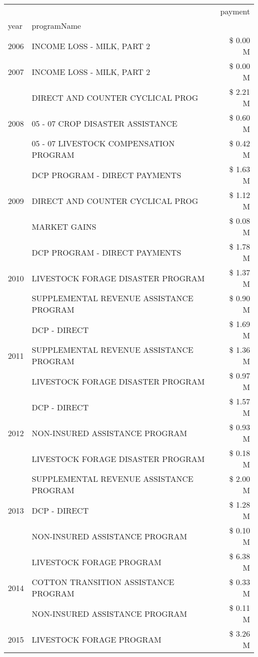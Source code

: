\begin{tabular}{llr}
\toprule
 &  & payment \\
year & programName &  \\
\midrule
2006 & INCOME LOSS - MILK, PART 2 & \$ 0.00 M \\
\cline{1-3}
2007 & INCOME LOSS - MILK, PART 2 & \$ 0.00 M \\
\cline{1-3}
\multirow[t]{3}{*}{2008} & DIRECT AND COUNTER CYCLICAL PROG & \$ 2.21 M \\
 & 05 - 07 CROP DISASTER ASSISTANCE & \$ 0.60 M \\
 & 05 - 07 LIVESTOCK COMPENSATION PROGRAM & \$ 0.42 M \\
\cline{1-3}
\multirow[t]{3}{*}{2009} & DCP PROGRAM - DIRECT PAYMENTS & \$ 1.63 M \\
 & DIRECT AND COUNTER CYCLICAL PROG & \$ 1.12 M \\
 & MARKET GAINS & \$ 0.08 M \\
\cline{1-3}
\multirow[t]{3}{*}{2010} & DCP PROGRAM - DIRECT PAYMENTS & \$ 1.78 M \\
 & LIVESTOCK FORAGE DISASTER  PROGRAM & \$ 1.37 M \\
 & SUPPLEMENTAL REVENUE ASSISTANCE PROGRAM & \$ 0.90 M \\
\cline{1-3}
\multirow[t]{3}{*}{2011} & DCP - DIRECT & \$ 1.69 M \\
 & SUPPLEMENTAL REVENUE ASSISTANCE PROGRAM & \$ 1.36 M \\
 & LIVESTOCK FORAGE DISASTER PROGRAM & \$ 0.97 M \\
\cline{1-3}
\multirow[t]{3}{*}{2012} & DCP - DIRECT & \$ 1.57 M \\
 & NON-INSURED ASSISTANCE PROGRAM & \$ 0.93 M \\
 & LIVESTOCK FORAGE DISASTER PROGRAM & \$ 0.18 M \\
\cline{1-3}
\multirow[t]{3}{*}{2013} & SUPPLEMENTAL REVENUE ASSISTANCE PROGRAM & \$ 2.00 M \\
 & DCP - DIRECT & \$ 1.28 M \\
 & NON-INSURED ASSISTANCE PROGRAM & \$ 0.10 M \\
\cline{1-3}
\multirow[t]{3}{*}{2014} & LIVESTOCK FORAGE PROGRAM & \$ 6.38 M \\
 & COTTON TRANSITION ASSISTANCE PROGRAM & \$ 0.33 M \\
 & NON-INSURED ASSISTANCE PROGRAM & \$ 0.11 M \\
\cline{1-3}
\multirow[t]{3}{*}{2015} & LIVESTOCK FORAGE PROGRAM & \$ 3.26 M \\

\end{tabular}
